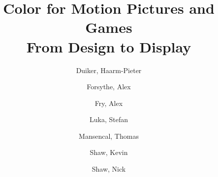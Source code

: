 \title{
    \LARGE{Color for Motion Pictures and Games}\\
    \vspace{5mm}
    \large{From Design to Display}
}

\author{
    Duiker, Haarm-Pieter\\
    \and
    Forsythe, Alex\\
    \and
    Fry, Alex\\
    \and
    Luka, Stefan\\
    \and
    Mansencal, Thomas\\
    \and
    Shaw, Kevin\\
    \and
    Shaw, Nick\\
}

\date{}
